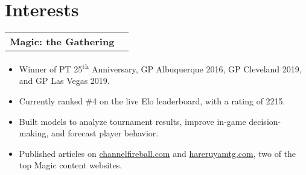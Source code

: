 \documentclass[letterpaper,11pt]{article}
\makeatletter
\newcommand{\resumeItemB}[2]{
	\item[]\small{
		\textbf{#1}{: #2 \vspace{-2pt}}
	}
}
\newcommand{\resumePoint}[1]{
	\item[$\bullet$]\small{
		{#1 \vspace{-2pt}}
	}
}
\newcommand{\resumeSubheadingShort}[2]{
	\small{\vspace{-1pt}\item[]
	\begin{tabular*}{0.97\textwidth}{l@{\extracolsep{\fill}}r}
		\textbf{#1} & #2 \\
	\end{tabular*}\vspace{-5pt}}
}
\newcommand{\resumeSubItemB}[2]{\resumeItemB{#1}{#2}\vspace{-4pt}}
\newcommand{\resumeSubHeadingListStart}{\begin{itemize}[leftmargin=*]}
\newcommand{\resumeSubHeadingListEnd}{\end{itemize}}
\newcommand{\resumeItemListStart}{\begin{itemize}}
\newcommand{\resumeItemListEnd}{\end{itemize}\vspace{-4pt}}
\makeatother
\begin{document}


\section{Interests}
\resumeSubHeadingListStart

	\resumeSubheadingShort
		{Magic: the Gathering}{}
		\resumeItemListStart
			\resumePoint{Winner of PT 25\textsuperscript{th} Anniversary, GP Albuquerque 2016, GP Cleveland 2019, and GP Las Vegas 2019.}
			\resumePoint{Currently ranked \#4 on the live Elo leaderboard, with a rating of 2215.}
			\resumePoint{Built models to analyze tournament results, improve in-game decision-making, and forecast player behavior.}
			\resumePoint{Published articles on \href{https://www.channelfireball.com/author/allen-wu/}{channelfireball.com} and \href{https://article.hareruyamtg.com/article/author/allenwu_en/?lang=en}{hareruyamtg.com}, two of the top Magic content websites.}
		\resumeItemListEnd
		
		

\resumeSubHeadingListEnd




\end{document}
